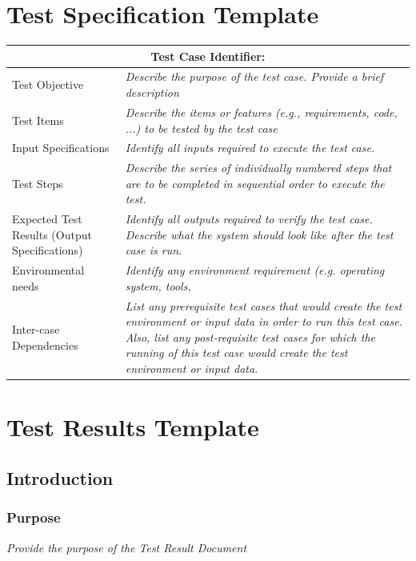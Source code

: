 \begin{appendices}
\section{Test Specification Template}
\label{ref:test_spec_template}
\begin{center}
\begin{longtable}{|p{3cm}|p{8cm}|}\hline
\multicolumn{2}{|c|}{\textbf{Test Case Identifier}: }\\\hline
Test Objective & \textit{Describe the purpose of the test case. Provide a brief description}\\\hline
Test Items & \textit{Describe the items or features (e.g., requirements, code, ...) to be tested by the test case}\\\hline
Input Specifications & \textit{Identify all inputs required to execute the test case.}\\\hline
Test Steps &  \textit{Describe the series of individually numbered steps that are to be completed in sequential order to execute the test.}\\\hline
Expected Test Results (Output Specifications) & \textit{Identify all outputs required to verify the test case. Describe what the system should look like after the test case is run.}\\\hline
Environmental needs &  \textit{Identify any environment requirement (e.g. operating system, tools,  }\\\hline
Inter-case Dependencies &  \textit{List any prerequisite test cases that would create the test environment or input data in order to run this test case.  Also, list any post-requisite test cases for which the running of this test case would create the test environment or input data.}\\\hline
\end{longtable}
\end{center}

\newpage
\section{Test Results Template}
\label{ref:test_result_template}

\subsection{Introduction}
\subsubsection{Purpose}
\textit{Provide the purpose of the Test Result Document}

\end{appendices}
